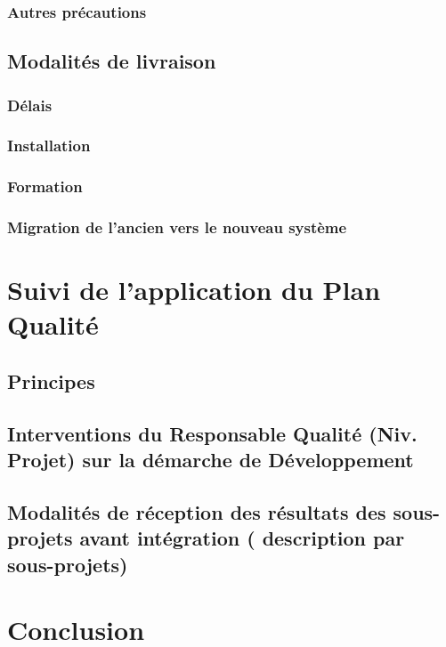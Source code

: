 \subsubsection{Autres précautions}
\subsection{Modalités de livraison}
\subsubsection{Délais}
\subsubsection{Installation}
\subsubsection{Formation}
\subsubsection{Migration de l’ancien vers le nouveau système}

\section{Suivi de l’application du Plan Qualité}
\subsection{Principes}
\subsection{Interventions du Responsable Qualité (Niv. Projet) sur la démarche de Développement}
\subsection{Modalités de réception des résultats des sous-projets avant intégration	( description par sous-projets)}

\section{Conclusion}

